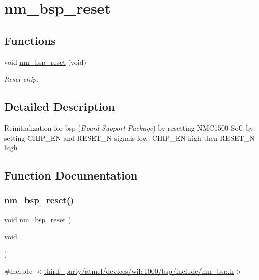 \hypertarget{group__NmBspResetFn}{}\section{nm\+\_\+bsp\+\_\+reset}
\label{group__NmBspResetFn}
\subsection*{Functions}
\begin{DoxyCompactItemize}
\item 
void \hyperlink{group__NmBspResetFn_ga3e540428a9246a27c61999ecb7e13d05}{nm\+\_\+bsp\+\_\+reset} (void)
\begin{DoxyCompactList}\small\item\em Reset chip. \end{DoxyCompactList}\end{DoxyCompactItemize}


\subsection{Detailed Description}
Reinitialization for bsp ({\itshape Board} {\itshape Support} {\itshape Package}) by resetting N\+M\+C1500 SoC by setting C\+H\+I\+P\+\_\+\+EN and R\+E\+S\+E\+T\+\_\+N signals low, C\+H\+I\+P\+\_\+\+EN high then R\+E\+S\+E\+T\+\_\+N high 

\subsection{Function Documentation}
\mbox{\label{group__NmBspResetFn_ga3e540428a9246a27c61999ecb7e13d05}} 
\subsubsection{\texorpdfstring{nm\+\_\+bsp\+\_\+reset()}{nm\_bsp\_reset()}}
{\footnotesize\ttfamily void nm\+\_\+bsp\+\_\+reset (\begin{DoxyParamCaption}\item[{void}]{ }\end{DoxyParamCaption})}



{\ttfamily \#include $<$\hyperlink{nm__bsp_8h}{third\+\_\+party/atmel/devices/wilc1000/bsp/include/nm\+\_\+bsp.\+h}$>$}



